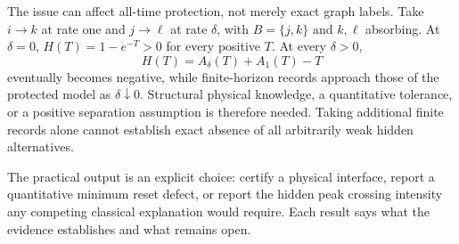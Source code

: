 The issue can affect all-time protection, not merely exact graph labels. Take
$i\to k$ at rate one and $j\to\ell$ at rate $\delta$, with
$B=\{j,k\}$ and $k,\ell$ absorbing. At $\delta=0$,
$H(T)=1-e^{-T}>0$ for every positive $T$. At every $\delta>0$,
\[
 H(T)=A_\delta(T)+A_1(T)-T
\]
eventually becomes negative, while finite-horizon records approach those of
the protected model as $\delta\downarrow0$. Structural physical knowledge,
a quantitative tolerance, or a positive separation assumption is therefore
needed. Taking additional finite records alone cannot establish exact absence
of all arbitrarily weak hidden alternatives.

The practical output is an explicit choice: certify a physical interface,
report a quantitative minimum reset defect, or report the hidden peak crossing
intensity any competing classical explanation would require. Each result says
what the evidence establishes and what remains open.
